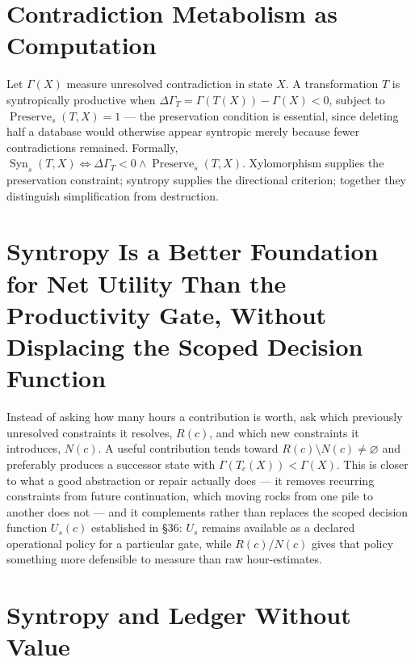 \documentclass[12pt]{article}
\begin{document}
\section{Contradiction Metabolism as Computation}

Let $\Gamma(X)$ measure unresolved contradiction in state $X$. A transformation $T$ is syntropically productive when $\Delta\Gamma_T=\Gamma(T(X))-\Gamma(X)<0$, subject to $\operatorname{Preserve}_s(T,X)=1$ — the preservation condition is essential, since deleting half a database would otherwise appear syntropic merely because fewer contradictions remained. Formally, $\operatorname{Syn}_s(T,X)\iff\Delta\Gamma_T<0\land\operatorname{Preserve}_s(T,X)$. Xylomorphism supplies the preservation constraint; syntropy supplies the directional criterion; together they distinguish simplification from destruction.

\section{Syntropy Is a Better Foundation for Net Utility Than the Productivity Gate, Without Displacing the Scoped Decision Function}

Instead of asking how many hours a contribution is worth, ask which previously unresolved constraints it resolves, $R(c)$, and which new constraints it introduces, $N(c)$. A useful contribution tends toward $R(c)\setminus N(c)\neq\varnothing$ and preferably produces a successor state with $\Gamma(T_c(X))<\Gamma(X)$. This is closer to what a good abstraction or repair actually does — it removes recurring constraints from future continuation, which moving rocks from one pile to another does not — and it complements rather than replaces the scoped decision function $U_s(c)$ established in \S36: $U_s$ remains available as a declared operational policy for a particular gate, while $R(c)/N(c)$ gives that policy something more defensible to measure than raw hour-estimates.

\section{Syntropy and Ledger Without Value}
\end{document}
